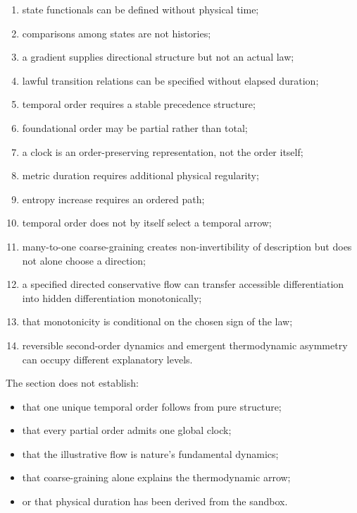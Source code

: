 \documentclass[
  11pt,
]{article}
\providecommand{\tightlist}{%
  \setlength{\itemsep}{0pt}\setlength{\parskip}{0pt}}
\begin{document}
\begin{enumerate}
\def\labelenumi{\arabic{enumi}.}
\tightlist
\item
  state functionals can be defined without physical time;
\item
  comparisons among states are not histories;
\item
  a gradient supplies directional structure but not an actual law;
\item
  lawful transition relations can be specified without elapsed duration;
\item
  temporal order requires a stable precedence structure;
\item
  foundational order may be partial rather than total;
\item
  a clock is an order-preserving representation, not the order itself;
\item
  metric duration requires additional physical regularity;
\item
  entropy increase requires an ordered path;
\item
  temporal order does not by itself select a temporal arrow;
\item
  many-to-one coarse-graining creates non-invertibility of description
  but does not alone choose a direction;
\item
  a specified directed conservative flow can transfer accessible
  differentiation into hidden differentiation monotonically;
\item
  that monotonicity is conditional on the chosen sign of the law;
\item
  reversible second-order dynamics and emergent thermodynamic asymmetry
  can occupy different explanatory levels.
\end{enumerate}

The section does not establish:

\begin{itemize}
\tightlist
\item
  that one unique temporal order follows from pure structure;
\item
  that every partial order admits one global clock;
\item
  that the illustrative flow is nature's fundamental dynamics;
\item
  that coarse-graining alone explains the thermodynamic arrow;
\item
  or that physical duration has been derived from the sandbox.
\end{itemize}
\end{document}
